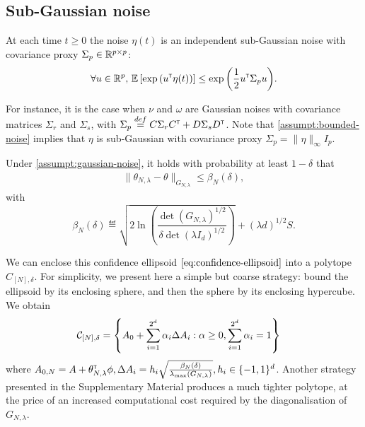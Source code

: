 \documentclass{article}
\begin{document}
\subsection{Sub-Gaussian noise}

\begin{assumption}
\label{assumpt:gaussian-noise}
At each time $t\geq0$ the noise $\eta(t)$ is an independent sub-Gaussian noise with covariance proxy $\Sigma_p \in \mathbb{R}^{p\times p}$:
\begin{equation*}
    \forall u\in\mathbb{R}^p,\, \operatorname*{\mathbb{E}} \left[ \exp{\left( u^{\mathsf{\scriptscriptstyle T}}\eta(t)\right)}\right] \leq \exp{\left( \frac{1}{2} u^{\mathsf{\scriptscriptstyle T}}\Sigma_p u\right)}.
\end{equation*}
\end{assumption}
For instance, it is the case when $\nu$ and $\omega$ are Gaussian noises with covariance matrices $\Sigma_r$ and $\Sigma_s$, with $\Sigma_p \stackrel{def}{=} C\Sigma_r C^{\mathsf{\scriptscriptstyle T}} + D\Sigma_s D^{\mathsf{\scriptscriptstyle T}}$. Note that \autoref{assumpt:bounded-noise} implies that $\eta$ is sub-Gaussian with covariance proxy $\Sigma_p=\|\eta\|_\infty I_p$.

\begin{theorem}
\label{thm:confidence_ellipsoid}
Under \autoref{assumpt:gaussian-noise}, it holds with probability at least $1-\delta$ that
\begin{align}
    \label{eq:confidence-ellipsoid}
    \| \theta_{N,\lambda}  - \theta\|_{G_{N,\lambda}} \leq \beta_N(\delta),
\end{align}
with
\begin{equation}
	\label{eq:beta_n}
    \beta_N(\delta)\eqdef \sqrt{2\ln \left(\frac{\det(G_{N,\lambda})^{1/2}}{\delta\det(\lambda I_d)^{1/2}}\right)}
     + (\lambda d)^{1/2}S.
\end{equation}
\end{theorem}

We can enclose this confidence ellipsoid $\eqref{eq:confidence-ellipsoid}$ into a polytope $C_{[N],\delta}$. For simplicity, we present here a simple but coarse strategy: bound the ellipsoid by its enclosing sphere, and then the sphere by its enclosing hypercube. We obtain
\begin{align}
    \label{eq:polytope}
     &\mathcal{C}_{[N],\delta} = \left\{ A_{0}+\sum_{i=1}^{2^d}\alpha_{i}\Delta A_{i}: \alpha\geq 0,  \sum_{i=1}^{2^d}\alpha_{i}=1\right\}
\end{align}
where $A_{0,N} = A + \theta_{N,\lambda}^{\mathsf{\scriptscriptstyle T}}\phi, \Delta A_{i} = {h_i} \sqrt{\frac{\beta_N(\delta)}{\lambda_{\max}(G_{N,\lambda})}}, h_i\in\{-1,1\}^d$. Another strategy presented in the Supplementary Material produces a much tighter polytope, at the price of an increased computational cost required by the diagonalisation of $G_{N,\lambda}$.
\end{document}
